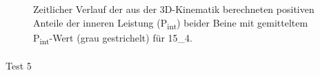 \documentclass[
  letterpaper,
  DIV=11]{scrartcl}
\makeatletter
\let\oldparagraph\paragraph
\renewcommand{\paragraph}{
    \@ifstar
      \xxxParagraphStar
      \xxxParagraphNoStar
  }
\newcommand{\xxxParagraphStar}[1]{\oldparagraph*{#1}\mbox{}}
\newcommand{\xxxParagraphNoStar}[1]{\oldparagraph{#1}\mbox{}}
\makeatother
\begin{document}
\begin{figure}


\caption{\label{fig-PInt_Kinematik_15_4}Zeitlicher Verlauf der aus der
3D-Kinematik berechneten positiven Anteile der inneren Leistung
(P\textsubscript{int}) beider Beine mit gemitteltem
P\textsubscript{int}-Wert (grau gestrichelt) für 15\_4.}

\end{figure}%

\paragraph{Test 5}
\end{document}

